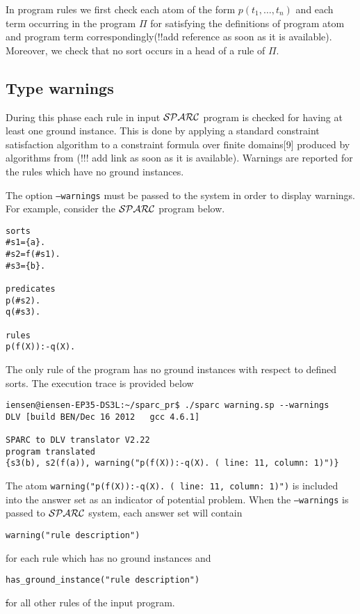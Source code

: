 \documentclass[12pt, letterpaper]{article}
\begin{document}
In program rules we first check each atom of the form $p(t_1,\dots,t_n)$ and each term occurring in the program $\Pi$ for satisfying
the definitions of program atom and program term correspondingly(!!add reference as soon as it is available). Moreover, we check that no sort occurs in a head of a rule of $\Pi$.
\subsection{Type warnings}\label{type_warnings}
During this phase each rule in input ${\cal SPARC}$ program is checked for having at least one ground instance. This is done by applying a standard constraint
satisfaction algorithm to a constraint formula over finite domains[9] produced by algorithms from (!!! add link as soon as it is available).
Warnings are reported for the rules which have no ground instances.

The option \texttt{--warnings} must be passed to the  system  in order to display warnings.
For example, consider the ${\cal SPARC}$ program below.

\begin{verbatim}
sorts
#s1={a}.
#s2=f(#s1).
#s3={b}.

predicates
p(#s2).
q(#s3).

rules
p(f(X)):-q(X).
\end{verbatim}

The only rule of the program has no ground instances with respect to defined sorts.
The execution trace is provided below
\begin{verbatim}
iensen@iensen-EP35-DS3L:~/sparc_pr$ ./sparc warning.sp --warnings 
DLV [build BEN/Dec 16 2012   gcc 4.6.1]

SPARC to DLV translator V2.22
program translated
{s3(b), s2(f(a)), warning("p(f(X)):-q(X). ( line: 11, column: 1)")}
\end{verbatim}

The atom \texttt{warning("p(f(X)):-q(X). ( line: 11, column: 1)")} is included into the answer set as an indicator of potential problem.
When the \texttt{--warnings} is passed to ${\cal SPARC}$ system, each answer set will contain 
\begin{verbatim}
warning("rule description") 
\end{verbatim}
for each rule which has no ground instances and 
\begin{verbatim}
has_ground_instance("rule description")
\end{verbatim}
\st
for all other rules of the input program.
\end{document}
